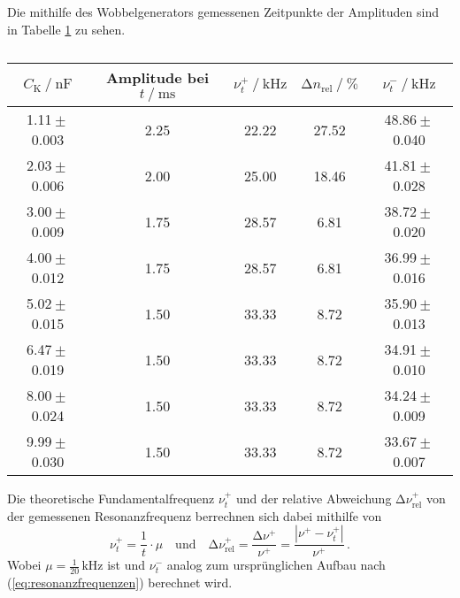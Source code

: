 Die mithilfe des Wobbelgenerators gemessenen Zeitpunkte der Amplituden sind in Tabelle \ref{tab:amplituden} zu sehen.
\begin{table}[H]
    \centering
    \caption{}
    \label{tab:amplituden}
    \begin{tabular}{c c c c c}
        \toprule
        ${C_\text{K}} \mathbin{/} \unit{\nano\farad}$ &
        {Amplitude bei $t \mathbin{/} \unit{\milli\second}$} &
        $\nu^+_{t} \mathbin{/} \unit{\kilo\hertz}$ &
        $\increment n_{\text{rel}} \mathbin{/} \unit{\percent}$ &
        $\nu^-_{t} \mathbin{/} \unit{\kilo\hertz}$ \\
        \midrule
           1.11${}\pm{}$0.003 &      2.25 &    22.22 &  27.52 & 48.86${}\pm{}$0.040 \\
           2.03${}\pm{}$0.006 &      2.00 &    25.00 &  18.46 & 41.81${}\pm{}$0.028 \\
           3.00${}\pm{}$0.009 &      1.75 &    28.57 &   6.81 & 38.72${}\pm{}$0.020 \\
           4.00${}\pm{}$0.012 &      1.75 &    28.57 &   6.81 & 36.99${}\pm{}$0.016 \\
           5.02${}\pm{}$0.015 &      1.50 &    33.33 &   8.72 & 35.90${}\pm{}$0.013 \\
           6.47${}\pm{}$0.019 &      1.50 &    33.33 &   8.72 & 34.91${}\pm{}$0.010 \\
           8.00${}\pm{}$0.024 &      1.50 &    33.33 &   8.72 & 34.24${}\pm{}$0.009 \\
           9.99${}\pm{}$0.030 &      1.50 &    33.33 &   8.72 & 33.67${}\pm{}$0.007 \\
        \bottomrule
        \end{tabular}
\end{table}

Die theoretische Fundamentalfrequenz $\nu^+_{t}$ und der relative Abweichung $\increment \nu^+_{\text{rel}}$
von der gemessenen Resonanzfrequenz berrechnen sich dabei mithilfe von
\begin{equation*}
    \nu^+_{t} = \frac {1} {t} \cdot \mu
    \quad\text{und}\quad 
    \increment \nu^+_{\text{rel}} = \frac{\increment \nu^+}{\nu^+}=\frac{\left|\nu^+-\nu^+_{t}\right|}{\nu^+} \, .
\end{equation*}
Wobei $\mu = \frac {1} {20} \, \unit{\kilo\hertz}$ ist und $\nu^-_{t}$ analog zum ursprünglichen Aufbau nach (\ref{eq:resonanzfrequenzen}) berechnet wird.
